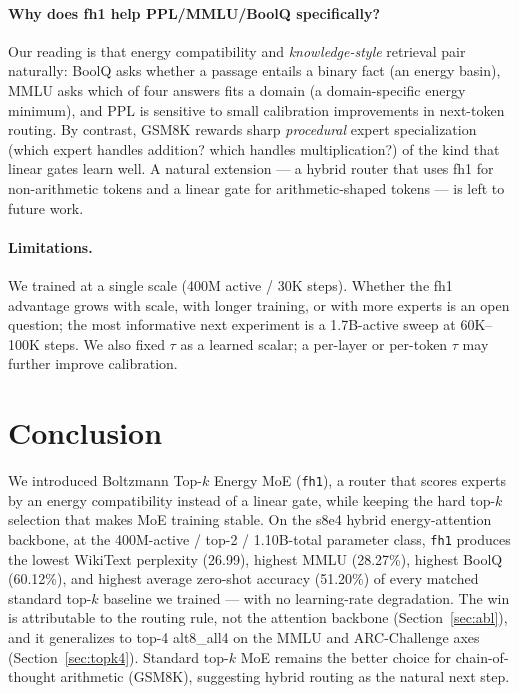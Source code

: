 \documentclass[oneside]{article}
\begin{document}
\paragraph{Why does fh1 help PPL/MMLU/BoolQ specifically?} Our reading is that energy compatibility and \emph{knowledge-style} retrieval pair naturally: BoolQ asks whether a passage entails a binary fact (an energy basin), MMLU asks which of four answers fits a domain (a domain-specific energy minimum), and PPL is sensitive to small calibration improvements in next-token routing. By contrast, GSM8K rewards sharp \emph{procedural} expert specialization (which expert handles addition? which handles multiplication?) of the kind that linear gates learn well. A natural extension --- a hybrid router that uses fh1 for non-arithmetic tokens and a linear gate for arithmetic-shaped tokens --- is left to future work.

\paragraph{Limitations.} We trained at a single scale (400M active / 30K steps). Whether the fh1 advantage grows with scale, with longer training, or with more experts is an open question; the most informative next experiment is a 1.7B-active sweep at 60K--100K steps. We also fixed $\tau$ as a learned scalar; a per-layer or per-token $\tau$ may further improve calibration.


\section{Conclusion}

We introduced Boltzmann Top-$k$ Energy MoE (\texttt{fh1}), a router that scores experts by an energy compatibility instead of a linear gate, while keeping the hard top-$k$ selection that makes MoE training stable. On the s8e4 hybrid energy-attention backbone, at the 400M-active / top-2 / 1.10B-total parameter class, \texttt{fh1} produces the lowest WikiText perplexity (26.99), highest MMLU (28.27\%), highest BoolQ (60.12\%), and highest average zero-shot accuracy (51.20\%) of every matched standard top-$k$ baseline we trained --- with no learning-rate degradation. The win is attributable to the routing rule, not the attention backbone (Section~\ref{sec:abl}), and it generalizes to top-4 alt8\_all4 on the MMLU and ARC-Challenge axes (Section~\ref{sec:topk4}). Standard top-$k$ MoE remains the better choice for chain-of-thought arithmetic (GSM8K), suggesting hybrid routing as the natural next step.



\end{document}
